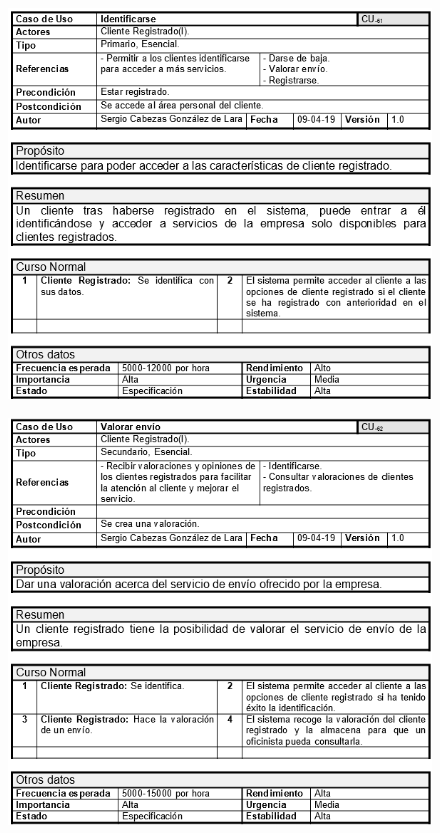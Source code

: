 \begin{figure}[H]
	\centering
	\includegraphics[width=16cm]{61}
\end{figure}
\begin{figure}[H]
	\centering
	\includegraphics[width=16cm]{62}
\end{figure}
